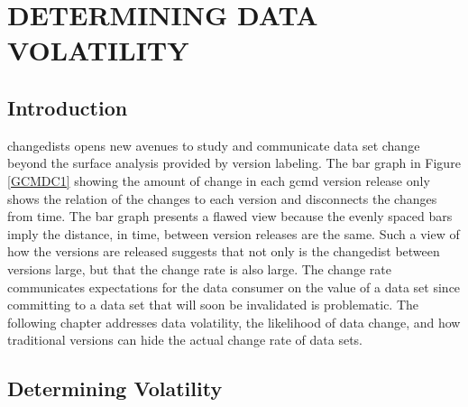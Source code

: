 
\chapter{DETERMINING DATA VOLATILITY} \label{Volatility}

\section{Introduction}

\Glspl{changedist} opens new avenues to study and communicate data set change beyond the surface analysis provided by version labeling.
The bar graph in Figure \ref{GCMDC1} showing the amount of change in each \gls{gcmd} version release only shows the relation of the \glspl{change} to each \gls{version} and disconnects the \glspl{change} from time.
The bar graph presents a flawed view because the evenly spaced bars imply the distance, in time, between \gls{version} releases are the same.
Such a view of how the \glspl{version} are released suggests that not only is the \gls{changedist} between \glspl{version} large, but that the change rate is also large.
The change rate communicates expectations for the data consumer on the value of a data set since committing to a data set that will soon be invalidated is problematic.
The following chapter addresses data \gls{volatility}, the likelihood of data change, and  how traditional \glspl{version} can hide the actual change rate of data sets.

\section{Determining Volatility}


